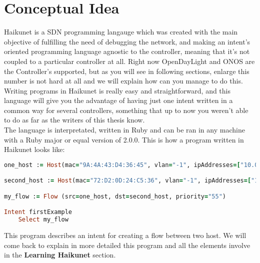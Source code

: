 \section{Conceptual Idea}

Haikunet is a SDN programming langauge which was created with the main objective of fulfilling the need of debugging the network, and making an intent's oriented programming language agnostic to the controller, meaning that it's not coupled to a particular controller at all. Right now OpenDayLight and ONOS are the Controller's supported, but as you will see in following sections, enlarge this number is not hard at all and we will explain how can you manage to do this.\\
Writing programs in Haikunet is really easy and straightforward, and this language will give you the advantage of having just one intent written in a common way for several controllers, something that up to now you weren't able to do as far as the writers of this thesis know.\\
The language is interpretated, written in Ruby and can be ran in any machine with a Ruby major or equal version of 2.0.0. This is how a program written in Haikunet looks like:

\begin{lstlisting}[language=Ruby,breaklines=true]
one_host := Host(mac="9A:4A:43:D4:36:45", vlan="-1", ipAddresses=["10.0.0.1"], elementId="of:0000000000000002", port="4")

second_host := Host(mac="72:D2:0D:24:C5:36", vlan="-1", ipAddresses=["10.0.0.4"], elementId="of:0000000000000003", port="4")

my_flow := Flow (src=one_host, dst=second_host, priority="55")

Intent firstExample
	Select my_flow
\end{lstlisting}

This program describes an intent for creating a flow between two host. We will come back to explain in more detailed this program and all the elements involve in the \textbf{Learning Haikunet} section.\\

